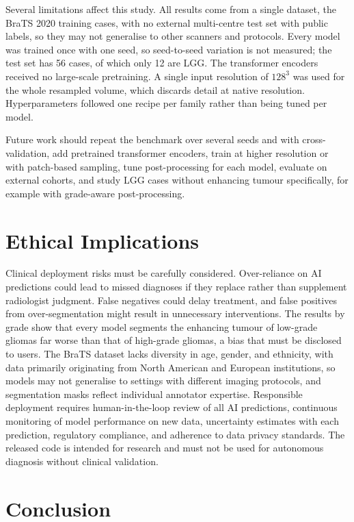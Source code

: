 \documentclass[a4paper,fleqn]{cas-sc}
\begin{document}
Several limitations affect this study. All results come from a single dataset, the BraTS 2020 training cases, with no external multi-centre test set with public labels, so they may not generalise to other scanners and protocols. Every model was trained once with one seed, so seed-to-seed variation is not measured; the test set has 56 cases, of which only 12 are LGG. The transformer encoders received no large-scale pretraining. A single input resolution of $128^3$ was used for the whole resampled volume, which discards detail at native resolution. Hyperparameters followed one recipe per family rather than being tuned per model.

Future work should repeat the benchmark over several seeds and with cross-validation, add pretrained transformer encoders, train at higher resolution or with patch-based sampling, tune post-processing for each model, evaluate on external cohorts, and study LGG cases without enhancing tumour specifically, for example with grade-aware post-processing.

\section{Ethical Implications}
\label{sec:ethics}

Clinical deployment risks must be carefully considered. Over-reliance on AI predictions could lead to missed diagnoses if they replace rather than supplement radiologist judgment. False negatives could delay treatment, and false positives from over-segmentation might result in unnecessary interventions. The results by grade show that every model segments the enhancing tumour of low-grade gliomas far worse than that of high-grade gliomas, a bias that must be disclosed to users. The BraTS dataset lacks diversity in age, gender, and ethnicity, with data primarily originating from North American and European institutions, so models may not generalise to settings with different imaging protocols, and segmentation masks reflect individual annotator expertise. Responsible deployment requires human-in-the-loop review of all AI predictions, continuous monitoring of model performance on new data, uncertainty estimates with each prediction, regulatory compliance, and adherence to data privacy standards. The released code is intended for research and must not be used for autonomous diagnosis without clinical validation.

\section{Conclusion}
\label{sec:conclusion}
\end{document}
